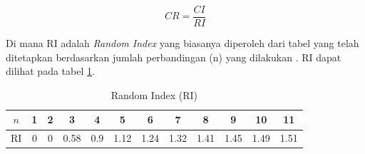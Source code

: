 \documentclass[journal,article,submit,pdftex,moreauthors]{Definitions/mdpi}
\begin{document}
\begin{equation}
CR = \frac{CI}{RI}
\label{eq:cr}
\end{equation}

Di mana RI adalah \textit{Random Index} yang biasanya diperoleh dari tabel yang telah ditetapkan berdasarkan jumlah perbandingan (n) yang dilakukan \cite{Singh2019}. RI dapat dilihat pada tabel \ref{random-index}.

\begin{table}[H]
    \caption{Random Index (RI)}
    \label{random-index}
    \centering
    \begin{tabular}{c|ccccccccccc}
        \toprule
        $n$ & 1 & 2 & 3 & 4 & 5 & 6 & 7 & 8 & 9 & 10 & 11 \\
        \midrule
        RI & 0 & 0 & 0.58 & 0.9 & 1.12 & 1.24 & 1.32 & 1.41 & 1.45 & 1.49 & 1.51 \\
        \bottomrule
    \end{tabular}
\end{table}







\end{document}
